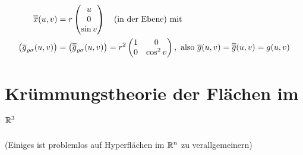 \begin{bsp}
\begin{enumerate}
\begin{align*}
   \overline{\overline x}(u,v) &= r \begin{pmatrix} u \\ 0 \\ \sin v \end{pmatrix}  \quad \text{(in der Ebene) mit} \\
   \big(\overline g_{\varrho \sigma}(u,v)\big) &= \big(\overline{\overline g}_{\varrho \sigma}(u,v)\big) = r^2 \begin{pmatrix}
                                                                                                               1 & 0 \\
                                                                                                               0 & \cos^2 v
                                                                                                              \end{pmatrix}, \text{ also } \overline g(u,v) = \overline{\overline g}(u,v) = g(u,v)   
  \end{align*}

 \end{enumerate}

\end{bsp}

\section{Krümmungstheorie der Flächen im $\mathbb{R}^3$}
(Einiges ist problemlos auf Hyperflächen im \(\mathbb{R}^n\) zu verallgemeinern)
